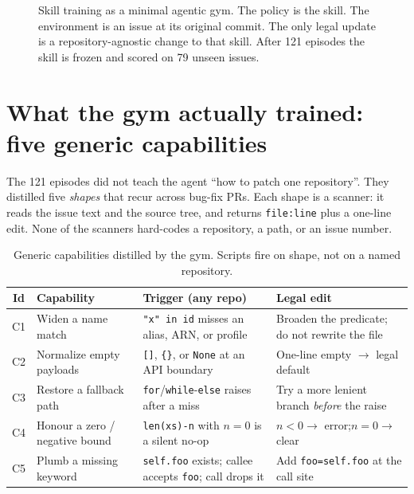 \documentclass[11pt,a4paper]{article}
\begin{document}
\begin{figure}[H]
\caption{Skill training as a minimal agentic gym. The policy is the
skill. The environment is an issue at its original commit. The only
legal update is a repository-agnostic change to that skill. After
121 episodes the skill is frozen and scored on 79 unseen issues.}
\label{fig:gym}
\end{figure}

\FloatBarrier

\section{What the gym actually trained: five generic capabilities}
\label{sec:caps}

The 121 episodes did not teach the agent ``how to patch one
repository''. They distilled five \emph{shapes} that recur across
bug-fix PRs. Each shape is a scanner: it reads the issue text and
the source tree, and returns \texttt{file:line} plus a one-line
edit. None of the scanners hard-codes a repository, a path, or an
issue number.

\begin{table}[H]
\centering
\caption{Generic capabilities distilled by the gym. Scripts fire on
shape, not on a named repository.}
\label{tab:caps}
\small
\begin{tabularx}{\textwidth}{@{}c>{\raggedright\arraybackslash}p{2.55cm}
  >{\raggedright\arraybackslash}X
  >{\raggedright\arraybackslash}X@{}}
\toprule
Id & Capability & Trigger (any repo) & Legal edit \\
\midrule
C1 & Widen a name match
  & \texttt{"x" in id} misses an alias, ARN, or profile
  & Broaden the predicate; do not rewrite the file \\[0.35em]
C2 & Normalize empty payloads
  & \texttt{[]}, \texttt{\{\}}, or \texttt{None} at an API boundary
  & One-line empty $\rightarrow$ legal default \\[0.35em]
C3 & Restore a fallback path
  & \texttt{for}/\texttt{while}-\texttt{else} raises after a miss
  & Try a more lenient branch \emph{before} the raise \\[0.35em]
C4 & Honour a zero / negative bound
  & \texttt{len(xs)-n} with $n{=}0$ is a silent no-op
  & $n{<}0 \rightarrow$ error;\quad $n{=}0 \rightarrow$ clear \\[0.35em]
C5 & Plumb a missing keyword
  & \texttt{self.foo} exists; callee accepts \texttt{foo}; call drops it
  & Add \texttt{foo=self.foo} at the call site \\
\bottomrule
\end{tabularx}
\end{table}
\end{document}

